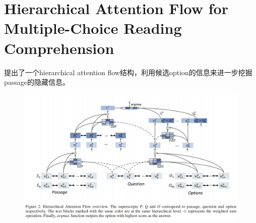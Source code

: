 \documentclass[a4paper,UTF8]{article}
\numberwithin{equation}{section}
\begin{document}
\section{Hierarchical Attention Flow for Multiple-Choice Reading Comprehension}
提出了一个hierarchical attention flow结构，利用候选option的信息来进一步挖掘passage的隐藏信息。
\begin{figure}[H]
	\centering
	\includegraphics[width=\textwidth]{10-1.png}
\end{figure}
\end{document}
